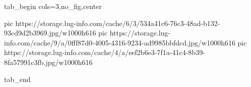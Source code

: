  
 
 
 
 


\ifcmt
  tab_begin cols=3,no_fig,center

     pic https://storage.lug-info.com/cache/6/3/534a41c6-76c3-48ad-b132-93cd9d2b3969.jpg/w1000h616%
		 pic https://storage.lug-info.com/cache/9/a/0fff87d0-4005-4316-9234-ad9985bbfdcd.jpg/w1000h616%
		 pic https://storage.lug-info.com/cache/4/a/eef2b6e3-7f1a-41c4-8b39-8fa57991c3fb.jpg/w1000h616%

  tab_end
\fi

